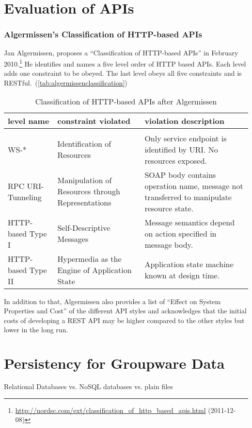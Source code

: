 \documentclass[12pt,a4paper]{scrartcl}		%
\newcommand{\citeurl}[2]{\url{#1} (#2)}
\begin{document}
\section{Evaluation of APIs}

\subsubsection{Algermissen's Classification of HTTP-based APIs}
\label{sec:algerm-class-http}

Jan Algermissen, proposes a ``Classification of HTTP-based APIs'' in February 2010.\footnote{
\citeurl{http://nordsc.com/ext/classification_of_http_based_apis.html}{2011-12-08}} 
He identifies and names a five level order of HTTP based APIs. Each level adds
one constraint to be obeyed. The last level obeys all five constraints and is
RESTful.~(\autoref{tab:algermissenclassification})

\begin{table}[h]
  \begin{tabular}{p{} p{} p{}}
    level name & constraint violated & violation description \\
    \hline \\
    WS-* &   Identification of Resources & Only service endpoint is identified by URI. No resources exposed. \\
    RPC URI-Tunneling &    Manipulation of Resources through Representations & SOAP body contains operation name, message not transferred to manipulate resource state. \\
    HTTP-based Type I &    Self-Descriptive Messages & Message semantics depend on action specified in message body. \\
    HTTP-based Type II &    Hypermedia as the Engine of Application State & Application state machine known at design time. \\
  \end{tabular}
  \caption{Classification of HTTP-based APIs after Algermissen}
  \label{tab:algermissenclassification}
\end{table}

In addition to that, Algermissen also provides a list of ``Effect on System
Properties and Cost'' of the different API styles and acknowledges that the
initial costs of developing a REST API may be higher compared to the other
styles but lower in the long run.




\section{Persistency for Groupware Data}
Relational Databases vs. NoSQL databases vs. plain files
\end{document}
